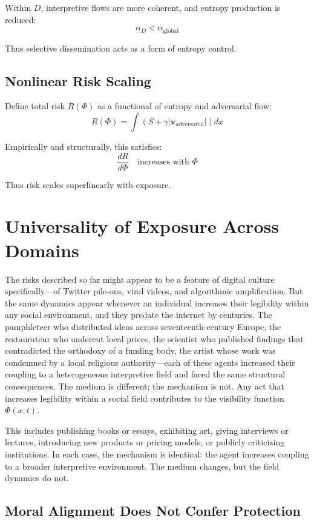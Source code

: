 \documentclass[12pt,a4paper]{article}
\begin{document}
Within $D$, interpretive flows are more coherent, and entropy production is reduced:
\[
\alpha_D < \alpha_{\text{global}}
\]

Thus selective dissemination acts as a form of entropy control.

\subsection{Nonlinear Risk Scaling}

Define total risk $R(\Phi)$ as a functional of entropy and adversarial flow:
\[
R(\Phi) = \int \left( S + \gamma |\mathbf{v}_{\text{adversarial}}| \right) dx
\]

Empirically and structurally, this satisfies:
\[
\frac{dR}{d\Phi} \quad \text{increases with } \Phi
\]

Thus risk scales superlinearly with exposure.



\section{Universality of Exposure Across Domains}

The risks described so far might appear to be a feature of digital culture specifically---of Twitter pile-ons, viral videos, and algorithmic amplification. But the same dynamics appear whenever an individual increases their legibility within any social environment, and they predate the internet by centuries. The pamphleteer who distributed ideas across seventeenth-century Europe, the restaurateur who undercut local prices, the scientist who published findings that contradicted the orthodoxy of a funding body, the artist whose work was condemned by a local religious authority---each of these agents increased their coupling to a heterogeneous interpretive field and faced the same structural consequences. The medium is different; the mechanism is not. Any act that increases legibility within a social field contributes to the visibility function $\Phi(x,t)$.

This includes publishing books or essays, exhibiting art, giving interviews or lectures, introducing new products or pricing models, or publicly criticizing institutions. In each case, the mechanism is identical: the agent increases coupling to a broader interpretive environment. The medium changes, but the field dynamics do not.

\subsection{Moral Alignment Does Not Confer Protection}
\end{document}
